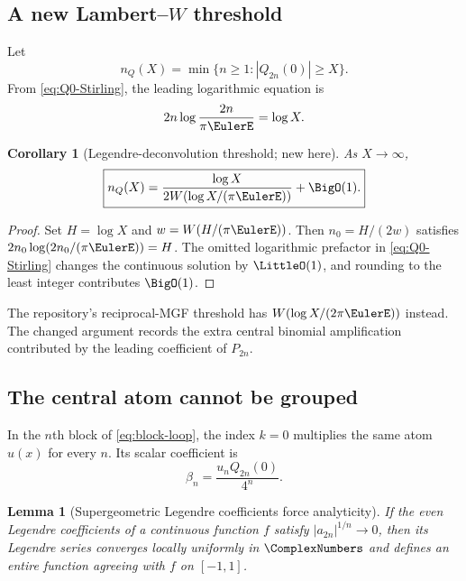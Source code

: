 \documentclass[11pt]{article}
\newtheorem{lemma}[theorem]{Lemma}
\newtheorem{corollary}[theorem]{Corollary}
\theoremstyle{definition}
\theoremstyle{remark}
\begin{document}
\subsection{A new Lambert--\texorpdfstring{$W$}{W} threshold}

Let
\[
 n_Q(X)=\min\{n\ge1:|Q_{2n}(0)|\ge X\}.
\]
From \eqref{eq:Q0-Stirling}, the leading logarithmic equation is
\[
 2n\log\frac{2n}{\pi\EulerE}=\log X.
\]

\begin{corollary}[Legendre-deconvolution threshold; new here]
\label{cor:Q-Lambert}
As $X\to\infty$,
\begin{equation}
 \boxed{
 n_Q(X)=
 \frac{\log X}{2W\!\left(\log X/(\pi\EulerE)\right)}+\BigO(1).}
 \label{eq:Q-Lambert}
\end{equation}
\end{corollary}

\begin{proof}
Set $H=\log X$ and $w=W(H/(\pi\EulerE))$.  Then
$n_0=H/(2w)$ satisfies
$2n_0\log(2n_0/(\pi\EulerE))=H$.  The omitted logarithmic prefactor in
\eqref{eq:Q0-Stirling} changes the continuous solution by $\LittleO(1)$, and
rounding to the least integer contributes $\BigO(1)$.
\end{proof}

The repository's reciprocal-MGF threshold has
$W(\log X/(2\pi\EulerE))$ instead.  The changed argument records the extra central
binomial amplification contributed by the leading coefficient of $P_{2n}$.

\subsection{The central atom cannot be grouped}

In the $n$th block of \eqref{eq:block-loop}, the index $k=0$ multiplies the
same atom $u(x)$ for every $n$.  Its scalar coefficient is
\begin{equation}
 \beta_n=\frac{u_nQ_{2n}(0)}{4^n}.
 \label{eq:beta-central}
\end{equation}

\begin{lemma}[Supergeometric Legendre coefficients force analyticity]
\label{lem:supergeom-analytic}
If the even Legendre coefficients of a continuous function $f$ satisfy
$|a_{2n}|^{1/n}\to0$, then its Legendre series converges locally uniformly in
$\ComplexNumbers$ and defines an entire function agreeing with $f$ on $[-1,1]$.
\end{lemma}
\end{document}
